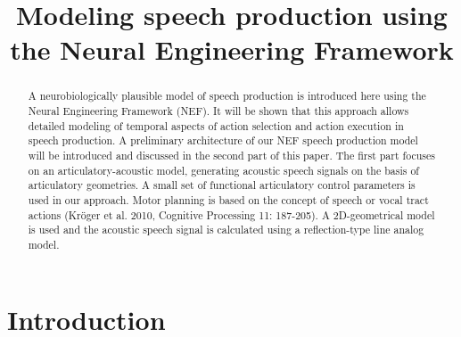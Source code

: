\documentclass[conference]{IEEEtran}
\begin{document}
\title{Modeling speech production using\\
  the Neural Engineering Framework}

\author{
\and
{}
}

\maketitle

\begin{abstract}
  A neurobiologically plausible model of speech production is
  introduced here using the Neural Engineering Framework (NEF).
  It will be shown that this approach allows
  detailed modeling of temporal aspects of action selection and action
  execution in speech production. A preliminary architecture of our
  NEF speech production model will be introduced and discussed in
  the second part of this paper. The first part focuses on an
  articulatory-acoustic model, generating acoustic speech signals on
  the basis of articulatory geometries. A small set of functional
  articulatory control parameters is used in our approach. Motor
  planning is based on the concept of speech or vocal tract actions
  (Kr\"{o}ger et al. 2010, Cognitive Processing 11: 187-205). A
  2D-geometrical model is used and the acoustic speech signal is
  calculated using a reflection-type line analog model.
\end{abstract}

\IEEEpeerreviewmaketitle

\section{Introduction}
\end{document}
